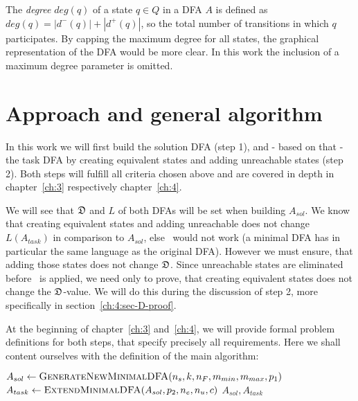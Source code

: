 The \emph{degree} $deg(q)$ of a state $q \in Q$ in a DFA $A$ is defined as $deg(q) = |d^-(q)| + |d^+(q)|$, so the total number of transitions in which $q$ participates. By capping the maximum degree for all states, the graphical representation of the DFA would be more clear. In this work the inclusion of a maximum degree parameter is omitted.


\section{Approach and general algorithm}

In this work we will first build the solution DFA (step 1), and - based on that - the task DFA by creating equivalent states and adding unreachable states (step 2). Both steps will fulfill all criteria chosen above and are covered in depth in chapter~\ref{ch:3} respectively chapter~\ref{ch:4}.

We will see that $\mathfrak{D}$ and $L$ of both DFAs will be set when building $A_{sol}$. We know that creating equivalent states and adding unreachable does not change $L(A_{task})$ in comparison to $A_{sol}$, else \MinAlg\ would not work (a minimal DFA has in particular the same language as the original DFA). However we must ensure, that adding those states does not change $\mathfrak{D}$. Since unreachable states are eliminated before \CompDist\ is applied, we need only to prove, that creating equivalent states does not change the $\mathfrak{D}$-value. We will do this during the discussion of step 2, more specifically in section~\ref{ch:4:sec-D-proof}.

At the beginning of chapter~\ref{ch:3} and~\ref{ch:4}, we will provide formal problem definitions for both steps, that specify precisely all requirements. Here we shall content ourselves with the definition of the main algorithm:
\vspace{0.2cm}
\begin{algorithmic}[1]
	\State $A_{sol} \gets \textsc{GenerateNewMinimalDFA}({n_s}, k, {n_F}, m_{min}, m_{max}, p_1)$
	\State $A_{task} \gets \textsc{ExtendMinimalDFA}(A_{sol}, p_2, {n_e},{n_u}, c)$
	\State \Return $A_{sol}, A_{task}$
	\EndFunction
\end{algorithmic}


